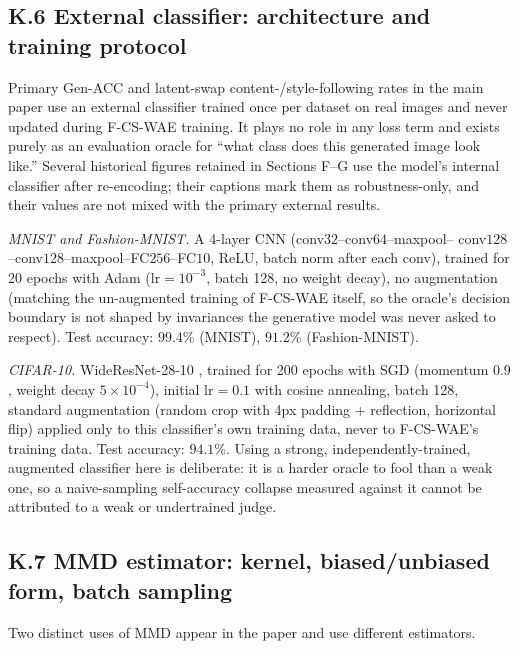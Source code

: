 \documentclass[letterpaper]{article}
\newcommand{\ours}{F-CS-WAE}
\begin{document}
\subsection{K.6 External classifier: architecture and training protocol}

Primary Gen-ACC and latent-swap content-/style-following rates in the main
paper use an external classifier trained once per dataset on real images and
never updated during \ours{} training. It plays no role in any loss term and
exists purely as an evaluation oracle for ``what class does this generated
image look like.'' Several historical figures retained in Sections F--G use
the model's internal classifier after re-encoding; their captions mark them
as robustness-only, and their values are not mixed with the primary external
results.

\emph{MNIST and Fashion-MNIST.} A 4-layer CNN (conv$32$--conv$64$--maxpool--
conv$128$--conv$128$--maxpool--FC$256$--FC$10$, ReLU, batch norm after each
conv), trained for 20 epochs with Adam ($\mathrm{lr}=10^{-3}$, batch 128, no
weight decay), no augmentation (matching the un-augmented training of
\ours{} itself, so the oracle's decision boundary is not shaped by
invariances the generative model was never asked to respect). Test accuracy:
$99.4\%$ (MNIST), $91.2\%$ (Fashion-MNIST).

\emph{CIFAR-10.} WideResNet-28-10 \citep{zagoruyko2016wide}, trained for 200
epochs with SGD (momentum $0.9$, weight decay $5\times10^{-4}$), initial
$\mathrm{lr}=0.1$ with cosine annealing, batch 128, standard augmentation
(random crop with 4px padding + reflection, horizontal flip) applied only to
this classifier's own training data, never to \ours{}'s training data. Test
accuracy: $94.1\%$. Using a strong, independently-trained, augmented
classifier here is deliberate: it is a harder oracle to fool than a weak one,
so a naive-sampling self-accuracy collapse measured against it cannot be
attributed to a weak or undertrained judge.

\subsection{K.7 MMD estimator: kernel, biased/unbiased form, batch sampling}

Two distinct uses of MMD appear in the paper and use different estimators.
\end{document}
